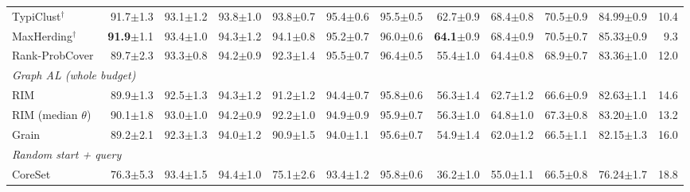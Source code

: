 \begin{table}[t]
\begin{adjustbox}{max width=\textwidth}
\begin{tabular}{lrrrrrrrrrrr}
\quad TypiClust$^{\dagger}$~\cite{hacohen2022active} & 91.7{\scriptsize$\pm$1.3} & 93.1{\scriptsize$\pm$1.2} & 93.8{\scriptsize$\pm$1.0} & 93.8{\scriptsize$\pm$0.7} & 95.4{\scriptsize$\pm$0.6} & 95.5{\scriptsize$\pm$0.5} & 62.7{\scriptsize$\pm$0.9} & 68.4{\scriptsize$\pm$0.8} & 70.5{\scriptsize$\pm$0.9} & 84.99{\scriptsize$\pm$0.9} & 10.4 \\
\quad MaxHerding$^{\dagger}$~\cite{bae2024generalized} & \textbf{91.9}{\scriptsize$\pm$1.1} & 93.4{\scriptsize$\pm$1.0} & 94.3{\scriptsize$\pm$1.2} & 94.1{\scriptsize$\pm$0.8} & 95.2{\scriptsize$\pm$0.7} & 96.0{\scriptsize$\pm$0.6} & \textbf{64.1}{\scriptsize$\pm$0.9} & 68.4{\scriptsize$\pm$0.9} & 70.5{\scriptsize$\pm$0.7} & 85.33{\scriptsize$\pm$0.9} & 9.3 \\
\quad Rank-ProbCover & 89.7{\scriptsize$\pm$2.3} & 93.3{\scriptsize$\pm$0.8} & 94.2{\scriptsize$\pm$0.9} & 92.3{\scriptsize$\pm$1.4} & 95.5{\scriptsize$\pm$0.7} & 96.4{\scriptsize$\pm$0.5} & 55.4{\scriptsize$\pm$1.0} & 64.4{\scriptsize$\pm$0.8} & 68.9{\scriptsize$\pm$0.7} & 83.36{\scriptsize$\pm$1.0} & 12.0 \\
\multicolumn{12}{l}{\textit{Graph AL (whole budget)}} \\
\quad RIM~\cite{zhang2021rim} & 89.9{\scriptsize$\pm$1.3} & 92.5{\scriptsize$\pm$1.3} & 94.3{\scriptsize$\pm$1.2} & 91.2{\scriptsize$\pm$1.2} & 94.4{\scriptsize$\pm$0.7} & 95.8{\scriptsize$\pm$0.6} & 56.3{\scriptsize$\pm$1.4} & 62.7{\scriptsize$\pm$1.2} & 66.6{\scriptsize$\pm$0.9} & 82.63{\scriptsize$\pm$1.1} & 14.6 \\
\quad RIM (median $\theta$)~\cite{zhang2021rim} & 90.1{\scriptsize$\pm$1.8} & 93.0{\scriptsize$\pm$1.0} & 94.2{\scriptsize$\pm$0.9} & 92.2{\scriptsize$\pm$1.0} & 94.9{\scriptsize$\pm$0.9} & 95.9{\scriptsize$\pm$0.7} & 56.3{\scriptsize$\pm$1.0} & 64.8{\scriptsize$\pm$1.0} & 67.3{\scriptsize$\pm$0.8} & 83.20{\scriptsize$\pm$1.0} & 13.2 \\
\quad Grain~\cite{zhang2021grain} & 89.2{\scriptsize$\pm$2.1} & 92.3{\scriptsize$\pm$1.3} & 94.0{\scriptsize$\pm$1.2} & 90.9{\scriptsize$\pm$1.5} & 94.0{\scriptsize$\pm$1.1} & 95.6{\scriptsize$\pm$0.7} & 54.9{\scriptsize$\pm$1.4} & 62.0{\scriptsize$\pm$1.2} & 66.5{\scriptsize$\pm$1.1} & 82.15{\scriptsize$\pm$1.3} & 16.0 \\
\multicolumn{12}{l}{\textit{Random start + query}} \\
\quad CoreSet~\cite{sener2017active} & 76.3{\scriptsize$\pm$5.3} & 93.4{\scriptsize$\pm$1.5} & 94.4{\scriptsize$\pm$1.0} & 75.1{\scriptsize$\pm$2.6} & 93.4{\scriptsize$\pm$1.2} & 95.8{\scriptsize$\pm$0.6} & 36.2{\scriptsize$\pm$1.0} & 55.0{\scriptsize$\pm$1.1} & 66.5{\scriptsize$\pm$0.8} & 76.24{\scriptsize$\pm$1.7} & 18.8 \\

\end{tabular}
\end{adjustbox}
\end{table}
